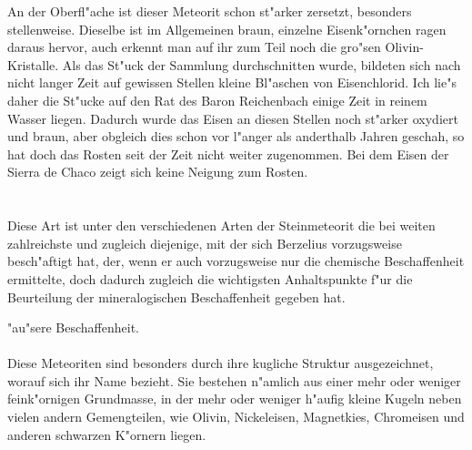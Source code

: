 \documentclass[a4paper, 11pt, oneside]{article}
\begin{document}
An der Oberfl"ache ist dieser Meteorit schon st"arker zersetzt, besonders stellenweise. Dieselbe ist im Allgemeinen braun, einzelne Eisenk"ornchen ragen daraus hervor, auch erkennt man auf ihr zum Teil noch die gro"sen Olivin-Kristalle. Als das St"uck der Sammlung durchschnitten wurde, bildeten sich nach nicht langer Zeit auf gewissen Stellen kleine Bl"aschen von Eisenchlorid. Ich lie"s daher die St"ucke auf den Rat des Baron Reichenbach einige Zeit in reinem Wasser liegen. Dadurch wurde das Eisen an diesen Stellen noch st"arker oxydiert und braun, aber obgleich dies schon vor l"anger als anderthalb Jahren geschah, so hat doch das Rosten seit der Zeit nicht weiter zugenommen. Bei dem Eisen der Sierra de Chaco zeigt sich keine Neigung zum Rosten.
\clearpage
\section{}
\subsection{}
\paragraph{}
Diese Art ist unter den verschiedenen Arten der Steinmeteorit die bei weiten zahlreichste und zugleich diejenige, mit der sich Berzelius vorzugsweise besch"aftigt hat, der, wenn er auch vorzugsweise nur die chemische Beschaffenheit ermittelte, doch dadurch zugleich die wichtigsten Anhaltspunkte f"ur die Beurteilung der mineralogischen Beschaffenheit gegeben hat.
\begin{center}
"au"sere Beschaffenheit.
\end{center}
\paragraph{}
Diese Meteoriten sind besonders durch ihre kugliche Struktur ausgezeichnet, worauf sich ihr Name bezieht. Sie bestehen n"amlich aus einer mehr oder weniger feink"ornigen Grundmasse, in der mehr oder weniger h"aufig kleine Kugeln neben vielen andern Gemengteilen, wie Olivin, Nickeleisen, Magnetkies, Chromeisen und anderen schwarzen K"ornern liegen.
\end{document}
